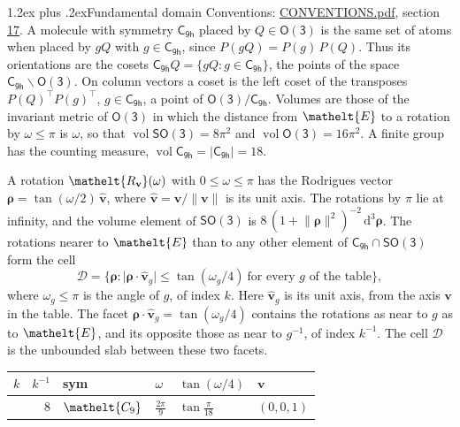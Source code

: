 \documentclass[10pt,a4paper]{article}
\makeatletter
\renewcommand\section{\@startsection{section}{1}{\z@}{-3ex plus -1ex minus -.2ex}%
  {1.2ex plus .2ex}{\normalfont\large\sffamily\bfseries\color{parttitle}}}
\numberwithin{equation}{section}
\newcommand{\eltfont}[1]{{\let\sigma\eltsigma\mathelt{#1}}}
\newcommand{\grp}[1]{\mathsf{#1}}
\newcommand{\cls}[1]{\eltfont{#1}}
\newcommand{\elt}[1]{\eltfont{#1}}
\newcommand{\dirvec}[3]{(#1, #2, #3)}
\newcommand{\unitaxis}{\hat{\mathbf{v}}}
\newcommand{\vv}{\mathbf{v}}
\newcommand{\diff}{\mathrm{d}}
\newcommand{\vol}{\operatorname{vol}}
\newcommand{\rodrigues}{\boldsymbol{\rho}}
\newcommand{\fcell}{\mathcal{D}}
\makeatother
\begin{document}
\section{Fundamental domain}\label{s:fundamental_domain}
Conventions: \href{../../CONVENTIONS.pdf}{CONVENTIONS.pdf}, section \href{../../CONVENTIONS.pdf\#conv.17}{17}.
\leavevmode\label{n:element.placement}A molecule with symmetry $\grp{C_{9h}}$ placed by $Q \in \grp{O(3)}$ is the same set of atoms when placed by $gQ$ with $g \in \grp{C_{9h}}$, since $P(gQ) = P(g)\,P(Q)$. \label{n:operator.cosets}Thus its orientations are the cosets $\grp{C_{9h}}Q = \{gQ : g \in \grp{C_{9h}}\}$, the points of the space $\grp{C_{9h}}\backslash\grp{O(3)}$. On column vectors a coset is the left coset of the transposes $P(Q)^{\top}P(g)^{\top}$, $g \in \grp{C_{9h}}$, a point of $\grp{O(3)}/\grp{C_{9h}}$.
\leavevmode\label{n:operator.volume}Volumes are those of the invariant metric of \href{O3.pdf}{$\grp{O(3)}$} in which the distance from $\elt{E}$ to a rotation by $\omega \le \pi$ is $\omega$, so that $\vol\grp{SO(3)} = 8\pi^2$ and $\vol\grp{O(3)} = 16\pi^2$. A finite group has the counting measure, $\vol\grp{C_{9h}} = |\grp{C_{9h}}| = 18$.

\leavevmode\label{n:vector.rodrigues}\label{n:vector.unitaxis}A rotation $\elt{R_{\vv}}(\omega)$ with $0 \le \omega \le \pi$ has the Rodrigues vector $\rodrigues = \tan(\omega/2)\,\unitaxis$, where $\unitaxis = \vv/\lVert\vv\rVert$ is its unit axis. The rotations by $\pi$ lie at infinity, and the volume element of \href{SO3.pdf}{$\grp{SO(3)}$} is $8\,(1 + \lVert\rodrigues\rVert^2)^{-2}\,\diff^3\rodrigues$.
\leavevmode\label{n:set.cell}The rotations nearer to $\elt{E}$ than to any other element of $\grp{C_{9h}} \cap \grp{SO(3)}$ form the cell
\begin{equation}\label{e:cell}\fcell = \bigl\{\rodrigues : \lvert\rodrigues\cdot\unitaxis_g\rvert \le \tan(\omega_g/4)\ \text{for every $g$ of the table}\bigr\},\end{equation}
where $\omega_g \le \pi$ is the angle of $g$, of index $k$. Here $\unitaxis_g$ is its unit axis, from the axis $\vv$ in the table. The facet $\rodrigues\cdot\unitaxis_g = \tan(\omega_g/4)$ contains the rotations as near to $g$ as to $\elt{E}$, and its opposite those as near to $g^{-1}$, of index $k^{-1}$. The cell $\fcell$ is the unbounded slab between these two facets.
{\small{\renewcommand{\arraystretch}{1.3}\begin{longtable}{@{}rrllll@{}}\toprule
$k$ & $k^{-1}$ & sym & $\omega$ & $\tan(\omega/4)$ & $\vv$\\\midrule\endhead
\bottomrule\endfoot\endlastfoot
1 & 8 & $\cls{C_{9}}$ & $\tfrac{2\pi}{9}$ & $\tan\tfrac{\pi}{18}$ & $\dirvec{0}{0}{1}$\\
\bottomrule\end{longtable}}}
\end{document}
